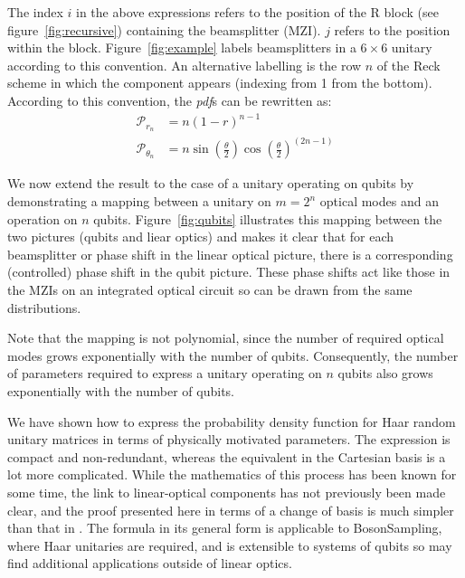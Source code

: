 \documentclass[aps,prl,twocolumn,floatfix]{revtex4}
\newcommand{\mat}[1]{\mathrm{#1}}
\newcommand{\by}{\times}
\newcommand{\of}[1]{\!\left(#1\right)}
\newcommand{\pdf}{{\it pdf}}
\newcommand{\prob}[1]{\mathcal{#1}}
\newcommand{\bosonsampling}{\textsc BosonSampling}
\begin{document}
The index \(i\) in the above expressions refers to the position of the
\(\mat{R}\) block (see figure~\ref{fig:recursive}) containing the beamsplitter
(MZI). \(j\) refers to the position within the block. Figure~\ref{fig:example}
labels beamsplitters in a \(6 \by 6\) unitary according to this convention. An
alternative labelling is the row \(n\) of the Reck scheme in which the component
appears (indexing from 1 from the bottom). According to this convention, the
\pdf{}s can be rewritten as:
\begin{align}
  \prob{P}_{r_{n}} &= n \left( 1-r \right)^{n-1} \\
  \prob{P}_{\theta_{n}} &= n \sin \of{ \frac{\theta}{2} } \cos \of{ \frac{
  \theta}{2}}^{\left( 2n-1 \right)}
\end{align}

We now extend the result to the case of a unitary operating on qubits by
demonstrating a mapping between a unitary on \(m=2^{n}\) optical modes and an
operation on \(n\) qubits.
Figure~\ref{fig:qubits} illustrates this mapping between the two pictures
(qubits and liear optics) and makes it clear that for each beamsplitter or phase
shift in the linear optical picture, there is a corresponding (controlled) phase
shift in the qubit picture. These phase shifts act like those in the MZIs on an
integrated optical circuit so can be drawn from the same distributions.

Note that the mapping is not polynomial, since the number of required optical
modes grows exponentially with the number of qubits. Consequently, the number of
parameters required to express a unitary operating on \(n\) qubits also grows
exponentially with the number of qubits.

We have shown how to express the probability density function for Haar random
unitary matrices in terms of physically motivated parameters. The expression is
compact and non-redundant, whereas the equivalent in the Cartesian basis is a
lot more complicated. While the mathematics of this process has been known
for some time, the link to linear-optical components has not previously been
made clear, and the proof presented here in terms of a change of basis is much
simpler than that in \cite{sp-jpa-43-385306}. The formula in its general form
is applicable to \bosonsampling{}, where Haar unitaries are required, and is
extensible to systems of qubits so may find additional applications outside of
linear optics.
\end{document}
